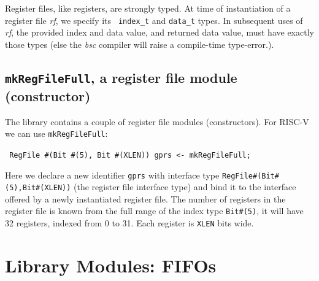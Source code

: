 \vspace{2ex}

{\BSV} Register files, like {\BSV} registers, are strongly typed.  At time
of instantiation of a register file \emph{rf}, we specify its {\tt
index\_t} and {\tt data\_t} types.  In subsequent uses of \emph{rf},
the provided index and data value, and returned data value, must have
exactly those types (else the \emph{bsc} compiler will raise a
compile-time type-error.).


\subsection{{\tt mkRegFileFull}, a register file module (constructor)}

\label{Sec_RegFile_module}


The {\BSV} library contains a couple of register file modules
(constructors). For RISC-V we can use {\tt mkRegFileFull}:


\begin{tabbing}\footnotesize\tt
\hmm RegFile \#(Bit \#(5), Bit \#(XLEN)) gprs <- mkRegFileFull;
\end{tabbing}

Here we declare a new identifier \verb|gprs| with interface type
\verb|RegFile#(Bit#(5),Bit#(XLEN))| (the register file interface type)
and bind it to the interface offered by a newly instantiated register
file.  The number of registers in the register file is known from the
full range of the index type \verb|Bit#(5)|, {\ie} it will have 32
registers, indexed from 0 to 31.  Each register is \verb|XLEN| bits
wide.


\section{{\BSV} Library Modules: FIFOs}


